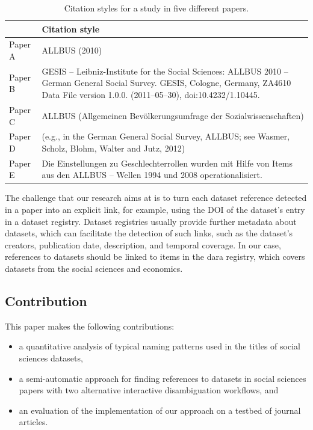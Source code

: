 \documentclass{IOS-Book-Article}
\newcommand{\dara}{\textsf{da\textbar ra}}
\begin{document}
\begin{table}[h!]
	\renewcommand{\arraystretch}{2}
	\centering
	\begin{tabular}{p{2.5cm}p{7cm}}
		\hline
		& Citation style \\
		\hline
		Paper A  & ALLBUS (2010)\\
		
		Paper B  & GESIS -- Leibniz-Institute for the Social Sciences: ALLBUS 2010 -- German General Social Survey. GESIS, Cologne, Germany, ZA4610 Data File version 1.0.0. (2011--05--30), doi:10.4232/1.10445. \\ 
		
		Paper C & ALLBUS (Allgemeinen Bev\"olkerungsumfrage der Sozialwissenschaften)\\
		
		Paper D & (e.g., in the German General Social Survey, ALLBUS; see Wasmer, Scholz, Blohm, Walter and Jutz, 2012)\\
		
		Paper E & Die Einstellungen zu Geschlechterrollen wurden mit Hilfe von Items aus den ALLBUS -- Wellen 1994 und 2008 operationalisiert.\\\hline
	\end{tabular}
	\caption{Citation styles for a study in five different papers.}
	\label{table:citation-variety}
\end{table}

The challenge that our research aims at is to turn each dataset reference detected in a paper into an explicit link, for example, using the DOI of the dataset's entry in a dataset registry. 
Dataset registries usually provide further metadata about datasets, which can facilitate the detection of such links, such as the dataset's creators, publication date, description, and temporal coverage.
In our case, references to datasets should be linked to items in the {\dara} registry, which covers datasets from the social sciences and economics.

\subsection{Contribution}

This paper makes the following contributions:
\begin{itemize}
\item a quantitative analysis of typical naming patterns used in the titles of social sciences datasets,
\item a semi-automatic approach for finding references to datasets in social sciences papers with two alternative interactive disambiguation workflows, and
\item an evaluation of the implementation of our approach on a testbed of journal articles.  
\end{itemize}
\end{document}
